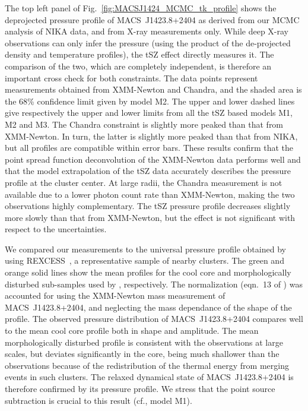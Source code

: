 \documentclass[twocolumn,traditabstract]{aa}
\newcommand{\rexcess}{{\gwpfont REXCESS}}
\begin{document}
The top left panel of Fig.~\ref{fig:MACSJ1424_MCMC_tk_profile} shows the deprojected pressure profile of \mbox{MACS~J1423.8+2404} as derived from our MCMC analysis of NIKA data, and from X-ray measurements only. While deep X-ray observations can only infer the pressure (using the product of the de-projected density and temperature profiles), the tSZ effect directly measures it. The comparison of the two, which are completely independent, is therefore an important cross check for both constraints. The data points represent measurements obtained from XMM-Newton and Chandra, and the shaded area is the 68\% confidence limit given by model M2. The upper and lower dashed lines give respectively the upper and lower limits from all the tSZ based models M1, M2 and M3. The Chandra constraint is slightly more peaked than that from XMM-Newton. In turn, the latter is slightly more peaked than that from NIKA, but all profiles are compatible within error bars. These results confirm that the point spread function deconvolution of the XMM-Newton data performs well and that the model extrapolation of the tSZ data accurately describes the pressure profile at the cluster center. At large radii, the Chandra measurement is not available due to a lower photon count rate  than XMM-Newton, making the two observations highly complementary. The tSZ  pressure profile decreases slightly more slowly than that from XMM-Newton, but the effect is not significant with respect to the uncertainties. 

We compared our measurements to the universal pressure profile obtained by \cite{arnaud2010} using  \rexcess\  \citep{bohringer2007}, a representative sample of nearby clusters. The green and orange solid lines show the mean profiles for the cool core and morphologically disturbed sub-samples used by \cite{arnaud2010}, respectively. The normalization (eqn.~13 of \cite{arnaud2010}) was accounted for using the XMM-Newton mass measurement of \mbox{MACS~J1423.8+2404}, and neglecting the mass dependance of the shape of the profile. The observed pressure distribution of  \mbox{MACS~J1423.8+2404} compares well to the mean cool core profile both in shape and amplitude. The mean morphologically disturbed profile is consistent with the observations at large scales, but deviates significantly in the core, being much shallower than the observations because of the redistribution of the thermal energy from merging events in such clusters. The relaxed dynamical state of \mbox{MACS~J1423.8+2404} is therefore confirmed by its pressure profile. We stress that the point source subtraction is crucial to this result (cf., model M1).
\end{document}
